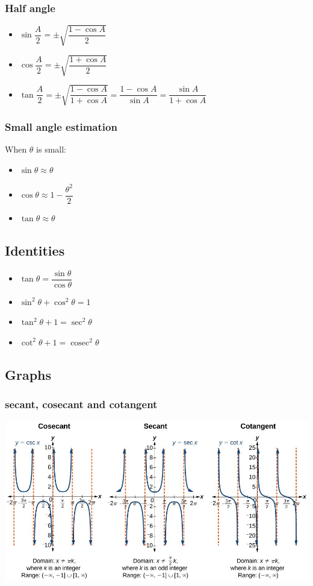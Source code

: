 \documentclass[A4paper]{article}
\DeclareMathOperator\cosec{cosec}
\begin{document}
	\subsubsection{Half angle}
	\begin{itemize}
		\item $\sin \dfrac{A}{2} = \pm \sqrt{\dfrac{1-\cos A}{2}}$
		\item $\cos \dfrac{A}{2} = \pm \sqrt{\dfrac{1+\cos A}{2}}$
		\item $\tan \dfrac{A}{2} = \pm \sqrt{\dfrac{1-\cos A}{1+\cos A}} = \dfrac{1-\cos A}{\sin A} = \dfrac{\sin A}{1+\cos A}$
	\end{itemize}
	\subsubsection{Small angle estimation}
	When $\theta$ is small:
	\begin{itemize}
		\item $\sin \theta \approx \theta$
		\item $\cos \theta \approx 1- \dfrac{\theta^2}{2}$
		\item $\tan \theta \approx \theta$
	\end{itemize}
	\subsection{Identities}
	\begin{itemize}
		\item $\tan \theta = \dfrac{\sin \theta}{\cos \theta}$
		\item $\sin^2 \theta + \cos^2 \theta = 1$
		\item $\tan^2 \theta + 1 = \sec^2 \theta$
		\item $\cot^2 \theta + 1 = \cosec^2 \theta$
	\end{itemize}

	\subsection{Graphs}
	\subsubsection{secant, cosecant and cotangent}
	\includegraphics[scale=0.9]{csc-sec-cot-graphs}
\end{document}
